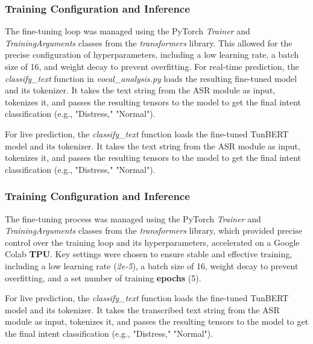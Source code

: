 \documentclass[12pt,a4paper,oneside,english]{book}
\begin{document}
\subsubsection{Training Configuration and Inference}
\label{sec:training tunbert}
The fine-tuning loop was managed using the PyTorch \textit{Trainer} and \textit{TrainingArguments} classes from the \textit{transformers} library. This allowed for the precise configuration of 
hyperparameters, including a low learning rate, a batch size of 16, and weight decay to prevent overfitting. For real-time prediction, the \textit{classify\_text} function in \textit{vocal\_analysis.py} 
loads the resulting fine-tuned model and its tokenizer. It takes the text string from the ASR module as input, tokenizes it, and passes the resulting tensors to the model to get the final intent 
classification (e.g., "Distress," "Normal").

For live prediction, the \textit{classify\_text} function loads the fine-tuned TunBERT model and its tokenizer. It takes the text string from the ASR module as input, tokenizes it, and passes the 
resulting tensors to the model to get the final intent classification (e.g., "Distress," "Normal").

\subsubsection{Training Configuration and Inference}
\label{sec:training_tunbert}

The fine-tuning process was managed using the PyTorch \textit{Trainer} and \textit{TrainingArguments} classes from the \textit{transformers} library, which provided precise control over the training loop and its hyperparameters, accelerated on a Google Colab \textbf{TPU}. 
Key settings were chosen to ensure stable and effective training, including a low learning rate (\textit{2e-5}), 
a batch size of 16, weight decay to prevent overfitting, and a set number of training \textbf{epochs} (5).

For live prediction, the \textit{classify\_text} function loads the fine-tuned TunBERT model and its tokenizer. It takes the transcribed text string from the ASR module as input, tokenizes it, and passes the 
resulting tensors to the model to get the final intent classification (e.g., "Distress," "Normal").
\end{document}
